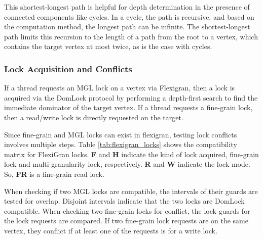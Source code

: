 This shortest-longest path is helpful for depth determination in the presence of connected components like cycles. In a cycle, the path is recursive, and based on the computation method, the longest path can be infinite. The shortest-longest path limits this recursion to the length of a path from the root to a vertex, which contains the target vertex at most twice, as is the case with cycles. 

\subsubsection{Lock Acquisition and Conflicts}

If a thread requests an MGL lock on a vertex via Flexigran, then a lock is acquired via the DomLock protocol by performing a depth-first search to find the immediate dominator of the target vertex.
If a thread requests a fine-grain lock, then a read/write lock is directly requested on the target. 

Since fine-grain and MGL locks can exist in flexigran, testing lock conflicts involves multiple steps. Table \ref{tab:flexigran_locks} shows the compatibility matrix for FlexiGran locks. \textbf{F} and \textbf{H} indicate the kind of lock acquired, fine-grain lock and multi-granularity lock, respectively. \textbf{R} and \textbf{W} indicate the lock mode. So, \textbf{FR} is a fine-grain read lock.

When checking if two MGL locks are compatible, the intervals of their guards are tested for overlap. Disjoint intervals indicate that the two locks are DomLock compatible. When checking two fine-grain locks for conflict, the lock guards for the lock requests are compared. If two fine-grain lock requests are on the same vertex, they conflict if at least one of the requests is for a write lock.


